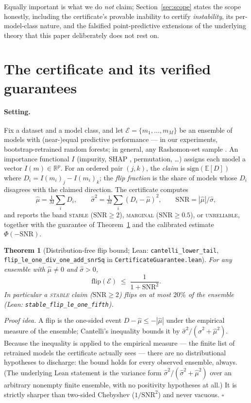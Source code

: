 \documentclass[10pt]{article}
\newtheorem{theorem}{Theorem}
\newcommand{\snr}{\mathrm{SNR}}
\newcommand{\flip}{\mathrm{flip}}
\newcommand{\stab}{\textsc{stable}}
\newcommand{\marg}{\textsc{marginal}}
\newcommand{\unrel}{\textsc{unreliable}}
\begin{document}
Equally important is what we do \emph{not} claim; Section~\ref{sec:scope} states the
scope honestly, including the certificate's provable inability to certify
\emph{instability}, its per-model-class nature, and the falsified point-predictive
extensions of the underlying theory that this paper deliberately does not rest on.

\section{The certificate and its verified guarantees}
\label{sec:certificate}

\paragraph{Setting.} Fix a dataset and a model class, and let $\mathcal{E} = \{m_1,
\dots, m_M\}$ be an ensemble of models with (near-)equal predictive performance ---
in our experiments, bootstrap-retrained random forests; in general, any Rashomon-set
sample \citep{semenova2022existence}. An importance functional $I$ (impurity, SHAP
\citep{lundberg2017unified}, permutation, \dots) assigns each model a vector
$I(m)\in\mathbb{R}^p$. For an ordered pair $(j,k)$, the \emph{claim} is
$\mathrm{sign}(\mathbb{E}[D])$ where $D_i = I(m_i)_j - I(m_i)_k$; the \emph{flip
fraction} is the share of models whose $D_i$ disagrees with the claimed direction. The
certificate computes
\[
\hat\mu = \tfrac1M\textstyle\sum_i D_i,\qquad
\hat\sigma^2 = \tfrac1M\textstyle\sum_i (D_i-\hat\mu)^2,\qquad
\snr = |\hat\mu|/\hat\sigma,
\]
and reports the band \stab{} ($\snr\ge 2$), \marg{} ($\snr \ge 0.5$), or \unrel{},
together with the guarantee of Theorem~\ref{thm:cantelli} and the calibrated estimate
$\Phi(-\snr)$.

\begin{theorem}[Distribution-free flip bound; Lean:
\texttt{cantelli\_lower\_tail}, \texttt{flip\_le\_one\_div\_one\_add\_snrSq} in
\texttt{CertificateGuarantee.lean}]
\label{thm:cantelli}
For any ensemble with $\hat\mu \neq 0$ and $\hat\sigma > 0$,
\[
\flip(\mathcal{E})\;\le\;\frac{1}{1+\snr^2}.
\]
In particular a \stab{} claim ($\snr\ge2$) flips on at most $20\%$ of the ensemble
(Lean: \texttt{stable\_flip\_le\_one\_fifth}).
\end{theorem}

\emph{Proof idea.} A flip is the one-sided event $D - \hat\mu \le -|\hat\mu|$ under the
empirical measure of the ensemble; Cantelli's inequality bounds it by
$\hat\sigma^2/(\hat\sigma^2 + \hat\mu^2)$. Because the inequality is applied to the
empirical measure --- the finite list of retrained models the certificate actually sees
--- there are no distributional hypotheses to discharge: the bound holds for every
observed ensemble, always. (The underlying Lean statement is the variance form
$\hat\sigma^2/(\hat\sigma^2+\hat\mu^2)$ over an arbitrary nonempty finite ensemble,
with no positivity hypotheses at all.) It is strictly sharper than two-sided Chebyshev
($1/\snr^2$) and never vacuous. \hfill$\square$
\end{document}
